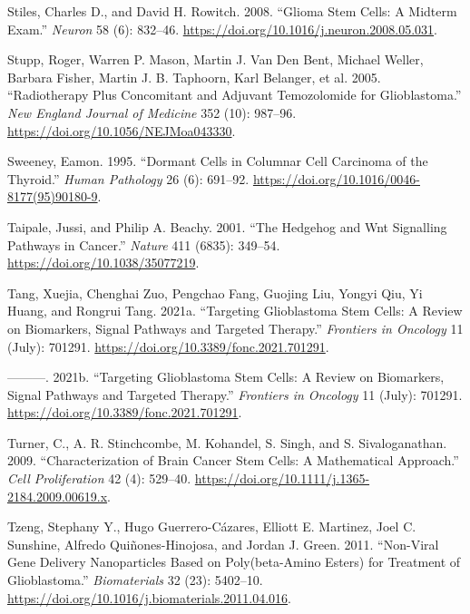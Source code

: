 \documentclass[
  letterpaper,
]{scrreprt}
\newlength{\cslhangindent}
\newenvironment{CSLReferences}[2] %
 {\begin{list}{}{%
  \setlength{\itemindent}{0pt}
  \setlength{\leftmargin}{0pt}
  \setlength{\parsep}{0pt}
  \ifodd #1
   \setlength{\leftmargin}{\cslhangindent}
   \setlength{\itemindent}{-1\cslhangindent}
  \fi
  \setlength{\itemsep}{#2\baselineskip}}}
 {\end{list}}
\theoremstyle{definition}
\theoremstyle{remark}
\begin{document}
\begin{CSLReferences}{1}{0}
Stiles, Charles D., and David H. Rowitch. 2008. {``Glioma Stem Cells: A
Midterm Exam.''} \emph{Neuron} 58 (6): 832--46.
\url{https://doi.org/10.1016/j.neuron.2008.05.031}.

Stupp, Roger, Warren P. Mason, Martin J. Van Den Bent, Michael Weller,
Barbara Fisher, Martin J. B. Taphoorn, Karl Belanger, et al. 2005.
{``Radiotherapy Plus Concomitant and Adjuvant Temozolomide for
Glioblastoma.''} \emph{New England Journal of Medicine} 352 (10):
987--96. \url{https://doi.org/10.1056/NEJMoa043330}.

Sweeney, Eamon. 1995. {``Dormant Cells in Columnar Cell Carcinoma of the
Thyroid.''} \emph{Human Pathology} 26 (6): 691--92.
\url{https://doi.org/10.1016/0046-8177(95)90180-9}.

Taipale, Jussi, and Philip A. Beachy. 2001. {``The Hedgehog and Wnt
Signalling Pathways in Cancer.''} \emph{Nature} 411 (6835): 349--54.
\url{https://doi.org/10.1038/35077219}.

Tang, Xuejia, Chenghai Zuo, Pengchao Fang, Guojing Liu, Yongyi Qiu, Yi
Huang, and Rongrui Tang. 2021a. {``Targeting Glioblastoma Stem Cells: A
Review on Biomarkers, Signal Pathways and Targeted Therapy.''}
\emph{Frontiers in Oncology} 11 (July): 701291.
\url{https://doi.org/10.3389/fonc.2021.701291}.

---------. 2021b. {``Targeting Glioblastoma Stem Cells: A Review on
Biomarkers, Signal Pathways and Targeted Therapy.''} \emph{Frontiers in
Oncology} 11 (July): 701291.
\url{https://doi.org/10.3389/fonc.2021.701291}.

Turner, C., A. R. Stinchcombe, M. Kohandel, S. Singh, and S.
Sivaloganathan. 2009. {``Characterization of Brain Cancer Stem Cells: A
Mathematical Approach.''} \emph{Cell Proliferation} 42 (4): 529--40.
\url{https://doi.org/10.1111/j.1365-2184.2009.00619.x}.

Tzeng, Stephany Y., Hugo Guerrero-Cázares, Elliott E. Martinez, Joel C.
Sunshine, Alfredo Quiñones-Hinojosa, and Jordan J. Green. 2011.
{``Non-Viral Gene Delivery Nanoparticles Based on Poly(beta-Amino
Esters) for Treatment of Glioblastoma.''} \emph{Biomaterials} 32 (23):
5402--10. \url{https://doi.org/10.1016/j.biomaterials.2011.04.016}.


\end{CSLReferences}
\end{document}
